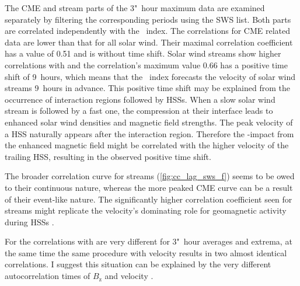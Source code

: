 The CME and stream parts of the 3"~hour maximum data are examined separately by filtering the corresponding periods using the SWS list. Both parts are correlated independently with the \Kp~index. The correlations for CME related data are lower than that for all solar wind. Their maximal correlation coefficient has a value of 0.51 and is without time shift.
Solar wind streams show higher correlations with \Kp{} and the correlation's maximum value 0.66 has a positive time shift of 9~hours, which means that the \Kp~index forecasts the velocity of solar wind streams 9~hours in advance.
This positive time shift may be explained from the occurrence of interaction regions followed by HSSs. When a slow solar wind stream is followed by a fast one, the compression at their interface leads to enhanced solar wind densities and magnetic field strengths. The peak velocity of a HSS naturally appears after the interaction region. Therefore the \Kp-impact from the enhanced magnetic field might be correlated with the higher velocity of the trailing HSS, resulting in the observed positive time shift.

The broader correlation curve for streams (\autoref{fig:cc_lag_sws_f}) seems to be owed to their continuous nature, whereas the more peaked CME curve can be a result of their event-like nature. The significantly higher correlation coefficient seen for streams might replicate the velocity's dominating role for geomagnetic activity during HSSs \citep{Holappa2014}.

For \vBz{} the correlations with \Kp{} are very different for 3"~hour averages and extrema, at the same time the same procedure with velocity results in two almost identical correlations. I suggest this situation can be explained by the very different autocorrelation times of $B_\text{z}$ and velocity \citep{Elliott2013}.


